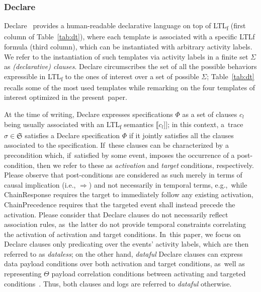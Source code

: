 \documentclass[information,article,accept,pdftex,oneauthor]{Definitions/mdpi}
\newcommand{\rrbraket}{\ensuremath{]\!]}}
\newcommand{\spec}{\ensuremath{\Phi}}
\newcommand{\LOG}{\ensuremath{\mathfrak{S}}}
\begin{document}
\subsubsection{Declare} 

Declare~\cite{4384001,Li2020} provides a human-readable declarative language on top of LTL\textsubscript{f} (first column  of Table~\ref{tab:dt}), where each template is associated with a specific LTL\textsf{f} formula (third column), which can be instantiated with arbitrary activity labels. We refer to the instantiation of such templates via activity labels in a finite set $\Sigma$ as \textit{(declarative) clauses}. Declare circumscribes the set of all the possible behaviors expressible in LTL\textsubscript{f} to the ones of interest over a set of possible  $\Sigma$; Table~\ref{tab:dt} recalls some of the most used templates while remarking on the four templates of interest optimized in the present~paper. 


 At the time of writing, Declare expresses specifications $\spec$ as a set of clauses $c_l$ being usually associated with an LTL\textsubscript{f} semantics $\llbracket c_l\rrbraket$; in this context, a~trace $\sigma\in\LOG$ satisfies a Declare specification $\spec$ if it jointly satisfies all the clauses associated to the specification. If~these clauses can be characterized by a precondition which, if~satisfied by some event, imposes the occurrence of a post-condition, then we refer to these as \textit{activation} and \textit{target} conditions, respectively. Please observe that post-conditions are considered as such merely in terms of causal implication (i.e., $\Rightarrow$) and not necessarily in temporal terms, e.g.,~while \textsf{ChainResponse} requires the target to immediately follow any existing activation, \textsf{ChainPrecedence} requires that the targeted event shall instead precede the activation. Please consider that Declare clauses do not necessarily reflect association rules, as~the latter do not provide temporal constraints correlating the activation of activation and target conditions. In~this paper, we focus on Declare clauses only predicating over the events' activity labels, which are then referred to as \textit{dataless}; on the other hand, \textit{dataful} Declare clauses can express  data payload conditions over both activation and target conditions, as~well as representing $\Theta$ payload correlation conditions between activating and targeted conditions~\cite{info14030173}. Thus, both clauses and logs are referred to \textit{dataful} otherwise. 
\end{document}
